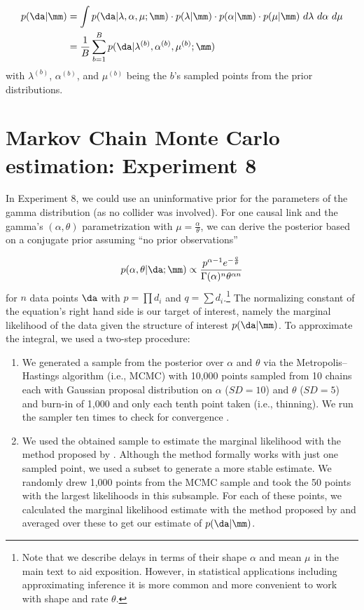 \begin{align}
p(\da|\mm) &= \int p(\da|\lambda,\alpha,\mu; \mm)\cdot p(\lambda|\mm)\cdot p(\alpha|\mm)\cdot p(\mu|\mm)~d\lambda~d\alpha~d\mu \\
&= \frac{1}{B} \sum_{b=1}^{B} p(\da|\lambda^{(b)}, \alpha^{(b)}, \mu^{(b)}; \mm)
\end{align}
with $\lambda^{(b)}$, $\alpha^{(b)}$, and $\mu^{(b)}$ being the $b$'s sampled points from the prior distributions.



\section{Markov Chain Monte Carlo estimation: Experiment 8}

In Experiment 8, we could use an uninformative prior for the parameters of the gamma distribution (as no collider was involved). For one causal link and the gamma's $(\alpha, \theta)$ parametrization with $\mu=\frac{\alpha}{\theta}$, we can derive the posterior based on a conjugate prior assuming ``no prior observations''

\begin{equation}
p(\alpha, \theta|\da;\mm)\propto \frac{p^{\alpha-1}e^{-\frac{q}{\theta}}}{\Gamma(\alpha)^n\theta^{\alpha n}}
\end{equation}
for $n$ data points $\da$ with $p=\prod{d_i}$ and $q=\sum{d_i}$.\footnote{Note that we describe delays in terms of their shape $\alpha$ and mean $\mu$ in the main text to aid exposition.  However, in statistical applications including approximating inference it is more common and more convenient to work with shape and rate $\theta$.} The normalizing constant of the equation's right hand side is our target of interest, namely the marginal likelihood of the data given the structure of interest $p(\da|\mm)$. To approximate the integral, we used a two-step procedure:

\begin{enumerate}
\item We generated a sample from the posterior over $\alpha$ and $\theta$ via the Metropolis--Hastings algorithm (i.e., MCMC) with 10,000 points sampled from 10 chains each with Gaussian proposal distribution on $\alpha$ ($SD=10$) and $\theta$ ($SD=5$) and burn-in of 1,000 and only each tenth point taken (i.e., thinning). We run the sampler ten times to check for convergence \citep[see][]{gelman2004bayesian}.
\item We used the obtained sample to estimate the marginal likelihood with the method proposed by \cite{chib2001marginal}. Although the method formally works with just one sampled point, we used a subset to generate a more stable estimate.%
We randomly drew 1,000 points from the MCMC sample and took the 50 points with the largest likelihoods in this subsample. For each of these points, we calculated the marginal likelihood estimate with the method proposed by \cite{chib2001marginal} and averaged over these to get our estimate of $p(\da|\mm)$.
\end{enumerate}

